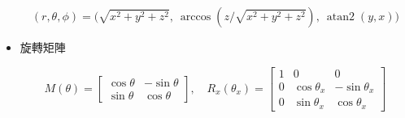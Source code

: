 \begin{itemize}
$$
(r,\theta,\phi)=\bigl(\sqrt{x^2+y^2+z^2},\ \arccos(z/\sqrt{x^2+y^2+z^2}),\ \operatorname{atan2}(y,x)\bigr)
$$

\item 旋轉矩陣

$$
M(\theta)=
\begin{bmatrix}
\cos\theta & -\sin\theta\\
\sin\theta & \cos\theta
\end{bmatrix},
\quad
R_x(\theta_x)=
\begin{bmatrix}
1 & 0 & 0\\
0 & \cos\theta_x & -\sin\theta_x \\
0 & \sin\theta_x & \cos\theta_x
\end{bmatrix}
$$

\end{itemize}
